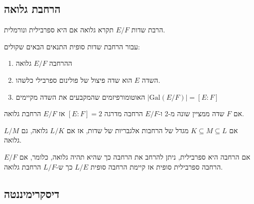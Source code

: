 \documentclass{tstextbook}
\begin{document}
\subsection{הרחבת גלואה}

\begin{definition}
הרבת שדות \(E / F\) תקרא גלואה אם היא ספרבילית ונורמלית.

\end{definition}
\begin{proposition}
עבור הרחבת שדות סופית התנאים הבאים שקולים:

  \begin{enumerate}
    \item ההרחבה \(E / F\) גלואה 


    \item השדה \(E\) הוא שדה פיצול של פולינום ספרבילי כלשהו. 


    \item האוטומורפיזמים שהמקבעים את השדה מקיימים \(\left\lvert  \mathrm{Gal}(E / F)  \right\rvert=[E:F]\)


  \end{enumerate}
\end{proposition}
\begin{proposition}
אם \(F\) שדה ממציין שונה מ-2 ו-\(E / F\) הרחבה מדרגה \([E:F]=2\) אז \(E / F\) הרחבת גלואה.

\end{proposition}
\begin{proposition}
אם \(K\subseteq M\subseteq L\) מגדל של הרחבות אלגבריות של שדות, אז אם \(L / K\) גלואה, גם \(L / M\) גלואה.

\end{proposition}
\begin{proposition}
אם הרחבה היא ספרבילית, ניתן להרחב את הרחבה כך שהיא תהיה גלואה, כלומר, אם \(E / F\) הרחבה ספרבילית סופית אז קיימת הרחבה סופית \(L / E\) כך ש-\(L / F\) הרחבת גלואה. 

\end{proposition}
\subsection{דיסקרימיננטה}
\end{document}
